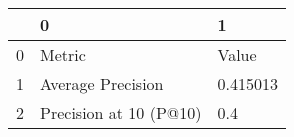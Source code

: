 \begin{tabular}{lll}
\toprule
{} &                       0 &         1 \\
\midrule
0 &                  Metric &     Value \\
1 &       Average Precision &  0.415013 \\
2 &  Precision at 10 (P@10) &       0.4 \\
\bottomrule
\end{tabular}
